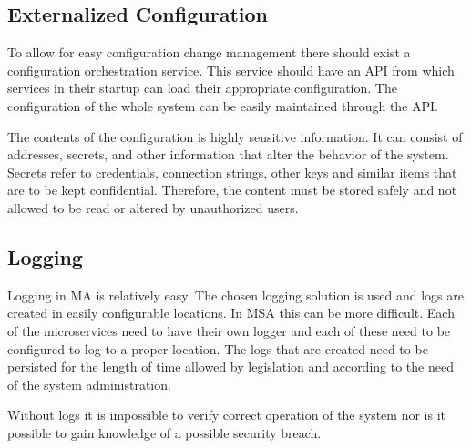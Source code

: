 \subsection{Externalized Configuration}
\begin{sloppypar}
    To allow for easy configuration change management there should exist a
    configuration orchestration service. This service should have an API from
    which services in their startup can load their appropriate configuration.
    The configuration of the whole system can be easily maintained through the
    API.
\end{sloppypar}
\begin{sloppypar}
    The contents of the configuration is highly sensitive information. It can
    consist of addresses, secrets, and other information that alter the behavior
    of the system. Secrets refer to credentials, connection strings, other keys
    and similar items that are to be kept confidential. Therefore, the content
    must be stored safely and not allowed to be read or altered by unauthorized
    users.
\end{sloppypar}

\subsection{Logging}
\begin{sloppypar}
    Logging in MA is relatively easy. The chosen logging solution is used and
    logs are created in easily configurable locations. In MSA this can be more
    difficult. Each of the microservices need to have their own logger and each
    of these need to be configured to log to a proper location. The logs that
    are created need to be persisted for the length of time allowed by
    legislation and according to the need of the system administration.
\end{sloppypar}
\begin{sloppypar}
    Without logs it is impossible to verify correct operation of the system nor
    is it possible to gain knowledge of a possible security breach. 
\end{sloppypar}



